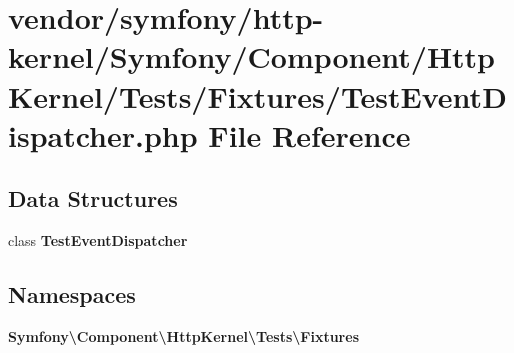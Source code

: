 \section{vendor/symfony/http-\/kernel/\+Symfony/\+Component/\+Http\+Kernel/\+Tests/\+Fixtures/\+Test\+Event\+Dispatcher.php File Reference}
\label{_test_event_dispatcher_8php}
\subsection*{Data Structures}
\begin{DoxyCompactItemize}
\item 
class {\bf Test\+Event\+Dispatcher}
\end{DoxyCompactItemize}
\subsection*{Namespaces}
\begin{DoxyCompactItemize}
\item 
 {\bf Symfony\textbackslash{}\+Component\textbackslash{}\+Http\+Kernel\textbackslash{}\+Tests\textbackslash{}\+Fixtures}
\end{DoxyCompactItemize}
